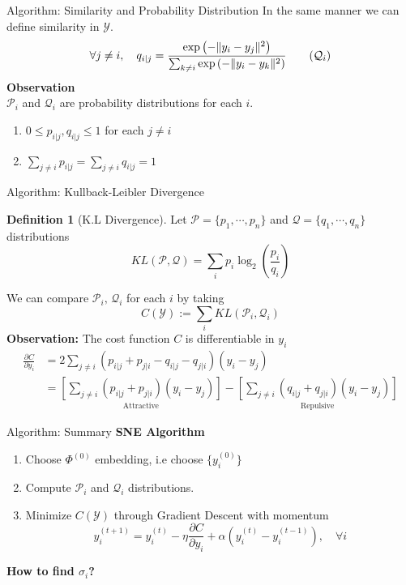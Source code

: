 \documentclass[10pt]{beamer}
\theoremstyle{definition}
\newtheorem{defn}{Definition}
\newcommand{\1}{\mathbbm{1}}
\newcommand{\YY}{\mathcal{Y}}
\newcommand{\PP}{\mathcal{P}}
\newcommand{\QQ}{\mathcal{Q}}
\begin{document}
\begin{frame}{Algorithm: Similarity and Probability Distribution}
  In the same manner we can define similarity in $\YY$.
  \begin{equation}
      \forall j\ne i,\quad q_{i|j}  = \frac{\exp\left(-\|y_i -
    y_j\|^2\right)}{\sum_{k\ne i}\exp\left(-\|y_i - y_k\|^2\right)}
    \tag{$\QQ_i$}
  \end{equation}
  \vfill
  {\bf Observation}\\
  $\PP_i$ and $\QQ_i$ are probability distributions  for each $i$.
  \begin{enumerate}
  \item $0 \le p_{i|j},q_{i|j} \le 1$ for each $j\ne i$
  \item $\sum_{j\ne i} p_{i|j} = \sum_{j\ne i} q_{i|j} = 1 $
\end{enumerate}
\end{frame}
\begin{frame}{Algorithm: Kullback-Leibler Divergence}{}
  \begin{defn}[K.L Divergence]
    \vspace{1px}
    Let $ \PP=\{p_1, \cdots, p_n\}$ and $\QQ=\{q_1,\cdots,q_n\}$  distributions
    \begin{equation}
      KL(\PP,\QQ) = \sum_i p_i\log_2\left( \frac{p_i}{q_i} \right)
    \end{equation}
  \end{defn}
  We can compare $\PP_i,\,\QQ_i$ for each $i$ by taking
  \begin{equation}
   C(\YY) := \sum_i KL(\PP_i,\QQ_i)
  \end{equation}
  {\bf Observation:} The cost function $C$ is differentiable in $y_i$
  \begin{equation}
    \begin{aligned}
      \frac{\partial C}{\partial y_i} &= 2\sum_{j\ne i}\left( p_{i|j} + p_{j|i} - q_{i|j}
      - q_{j|i} \right) \left( y_i - y_j \right)\\
      &= \underset{\mbox{Attractive}}{\left[\sum_{j\ne i} \left( p_{i|j} + p_{j|i}
      \right)(y_i-y_j)\right]} - \underset{\mbox{Repulsive}}{\left[\sum_{j\ne i}
          \left( q_{i|j}+q_{j|i}\right)\left( y_i-y_j \right)\right]}
    \end{aligned}
  \end{equation}
\end{frame}
\begin{frame}{Algorithm: Summary}{}
  {\bf SNE Algorithm}
  \begin{enumerate}
    \item Choose $\Phi^{(0)}$ embedding, i.e choose $\{y_i^{(0)}\}$
    \item Compute $\PP_i$ and $\QQ_i$ distributions.
    \item Minimize $C(\YY)$ through Gradient Descent with momentum 
      \[
        y_i^{(t+1)} = y_i^{(t)} - \eta \frac{\partial C}{\partial y_i} +
        \alpha \left( y_i^{(t)} - y_i^{(t-1)} \right),\quad
        \forall i
      \]
  \end{enumerate}
  \vfill
  \begin{center}
    {\bf\large How to find $\sigma_i$?}
  \end{center}
\end{frame}
\end{document}
